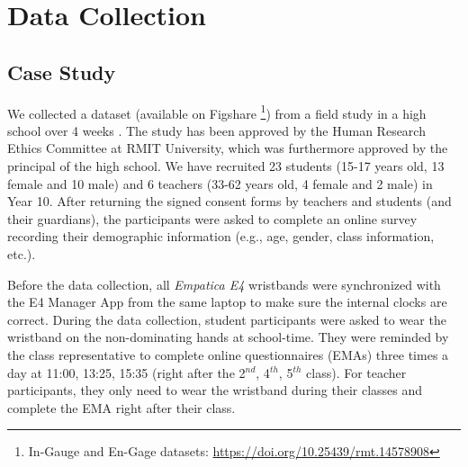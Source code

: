 \documentclass[sigconf]{acmart}
\begin{document}

\begin{comment}
\section{Research Questions}
\begin{itemize}
    \item RQ1: Is there correlation between quality of responses and survey completion time?
    \item RQ2: Can we infer the quality of self-report responses using EDA data?
    \item RQ3: Can we improve the prediction performance by selecting reliable self-report responses?
\end{itemize}
\end{comment}
\section{Data Collection}
\label{sec:Data collection}
\subsection{Case Study}
We collected a dataset \cite{gao2021ingauge,gao2021understanding} (available on Figshare \footnote{In-Gauge and En-Gage datasets: \href{https://doi.org/10.25439/rmt.14578908}{https://doi.org/10.25439/rmt.14578908}}) from a field study in a high school over 4 weeks  . The study has been approved by the Human Research Ethics Committee at RMIT University, which was furthermore approved by the principal of the high school. We have recruited 23 students (15-17 years old, 13 female and 10 male) and 6 teachers (33-62 years old, 4 female and 2 male) in Year 10. After returning the signed consent forms by teachers and students (and their guardians), the participants were asked to complete an online survey recording their demographic information (e.g., age,  gender, class information, etc.). 

Before the data collection, all \textit{Empatica E4} wristbands  were synchronized with the E4 Manager App from the same laptop to make sure the internal clocks are correct. During the data collection, student participants were asked to wear the wristband on the non-dominating hands at school-time. They were reminded by the class representative to complete online questionnaires (EMAs) three times a day at 11:00, 13:25, 15:35 (right after the 2$^{nd}$, 4$^{th}$, 5$^{th}$ class). For teacher participants, they only need to wear the wristband during their classes and complete the EMA right after their class. 
\end{document}
